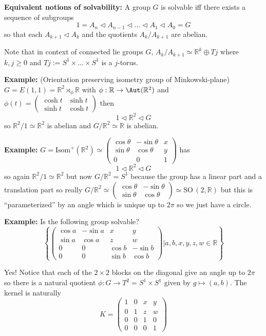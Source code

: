 \documentclass[12pt]{article}
\newcommand{\R}{\mathbb{R}}
\newcommand{\SO}{\text{SO}\,}
\begin{document}
    \textbf{Equivalent notions of solvability:} A group $G$ is solvable iff there exists a sequence of subgroups 
    \[1 = A_n \triangleleft A_{n-1} \triangleleft \dots \triangleleft A_1 \triangleleft A_0 = G\]
    so that each $A_{k+1} \triangleleft A_k$ and the quotients $A_k/A_{k+1}$ are abelian.

    Note that in context of connected lie groups $G$, $A_k/A_{k+1} \simeq \R^k \oplus Tj$ where $k, j \geq 0$ and $Tj:= S^1 \times \dots \times S^1$ is a $j$-torus.

    \textbf{Example:} (Orientation preserving isometry group of Minkowski-plane) $G = E(1, 1) = \R^2 \rtimes_{\phi} \R$ with $\phi: \R \to \Aut(\R^2)$ and $\phi(t) = \begin{pmatrix}
        \cosh t & \sinh t\\ 
        \sinh t & \cosh t
    \end{pmatrix}$ then 
    \[1 \triangleleft \R^2 \triangleleft G\]
    so $\R^2/1 \simeq \R^2$ is abelian and $G/\R^2 \simeq \R$ is abelian.

    \textbf{Example:} $G = \text{Isom}^+(\R^2) \simeq \begin{pmatrix}
        \cos \theta & -\sin \theta & x\\ 
        \sin \theta & \cos \theta & y\\
        0 & 0 & 1
    \end{pmatrix}$ has 
    \[1 \triangleleft \R^2 \triangleleft G\] 
    so again $\R^2/1 \simeq \R^2$ but now $G/\R^2 = S^1$ because the group has a linear part and a translation part so really $G/\R^2 \simeq \begin{pmatrix}
        \cos \theta & -\sin \theta\\ 
        \sin \theta & \cos \theta
    \end{pmatrix} \simeq \SO(2, \R)$ but this is ``parameterized'' by an angle which is unique up to $2\pi$ so we just have a circle. 

    \textbf{Example:} Is the following group solvable? 
    \[\left\{\begin{pmatrix}
        \cos a & -\sin a & x & y\\ 
        \sin a & \cos a & z & w\\ 
        0 & 0 & \cos b & -\sin b\\ 
        0 & 0 & \sin b & \cos b
    \end{pmatrix} \bigg\vert a, b,x, y, z, w \in \R\right\}\]

    Yes! Notice that each of the $2\times 2$ blocks on the diagonal give an angle up to $2\pi$ so there is a natural quotient $\phi: G \to T^2 = S^1 \times S^1$ given by $g \mapsto (a, b)$. The kernel is naturally 
    \[K = \begin{pmatrix}
        1 & 0 & x & y\\ 
        0 & 1 & z & w\\
        0 & 0 & 1 & 0\\
        0 & 0 & 0 & 1
    \end{pmatrix}\]
\end{document}

